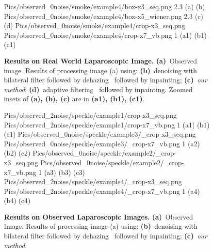 \begin{figure}[!t]
     {Pics/observed_0noise/smoke/example4/box-x3_seq.png} {2.3} {(a)} {(b)}
     {Pics/observed_0noise/smoke/example4/box-x5_wiener.png} {2.3} {(c)} {(d)}
     {Pics/observed_0noise/smoke/example4/crop-x3_seq.png} {Pics/observed_0noise/smoke/example4/crop-x7_vb.png} {1} {(a1)} {(b1)} {(c1)}
    \caption
    {
        {\bf Results on Real World Laparoscopic Image.}
        {\bf (a)}~Observed image.
        Results of processing image (a) using:
        {\bf (b)}~denoising with bilateral filter followed by dehazing~\cite{he2011dark} followed by inpainting;
        {\bf (c)}~{\em our method};
        {\bf (d)}~adaptive filtering~\cite{gibson2013wiener} followed by inpainting.
        Zoomed insets of {\bf (a), (b), (c)} are in {\bf (a1), (b1), (c1)}.
    }
    \label{fig:resultsObs3}
\end{figure}

\begin{figure}[!t]
     {Pics/observed_2noise/speckle/example1/crop-x3_seq.png} {Pics/observed_2noise/speckle/example1/crop-x7_vb.png} {1} {(a1)} {(b1)} {(c1)}
     {Pics/observed_0noise/speckle/example3/_crop-x3_seq.png} {Pics/observed_0noise/speckle/example3/_crop-x7_vb.png} {1} {(a2)} {(b2)} {(c2)}
     {Pics/observed_0noise/speckle/example2/_crop-x3_seq.png} {Pics/observed_0noise/speckle/example2/_crop-x7_vb.png} {1} {(a3)} {(b3)} {(c3)}
     {Pics/observed_2noise/speckle/example4/_crop-x3_seq.png} {Pics/observed_2noise/speckle/example4/_crop-x7_vb.png} {1} {(a4)} {(b4)} {(c4)}
    \caption
    {
        {\bf Results on Observed Laparoscopic Images.}
        {\bf (a)}~Observed Image.
        Results of processing image (a) using:
        {\bf (b)}~denoising with bilateral filter followed by dehazing~\cite{he2011dark} followed by inpainting;
        {\bf (c)}~{\em our method}.
    }
    \label{fig:resultsObs4}
\end{figure}
